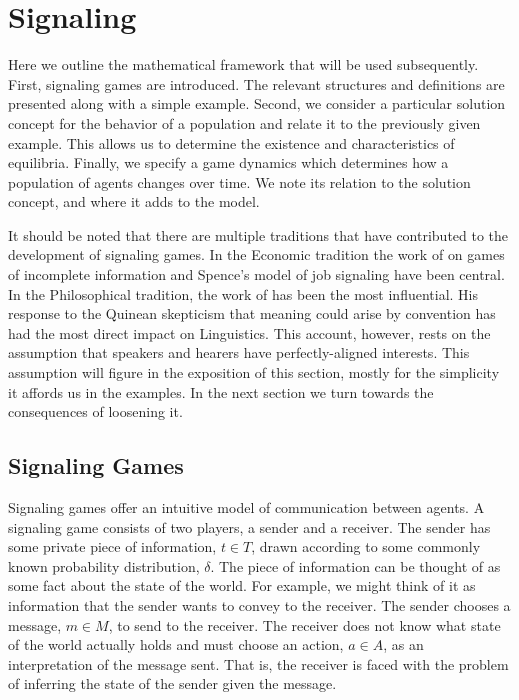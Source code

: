 \documentclass[12pt]{article}
\theoremstyle{definition} \newtheorem{definition}{Definition}
\begin{document}
\section{Signaling}
\label{Signaling}

Here we outline the mathematical framework that will be used subsequently. First, signaling games are introduced. The relevant structures and definitions are presented along with a simple example. Second, we consider a particular solution concept for the behavior of a population and relate it to the previously given example. This allows us to determine the existence and characteristics of equilibria. Finally, we specify a game dynamics which determines how a population of agents changes over time. We note its relation to the solution concept, and where it adds to the model.

It should be noted that there are multiple traditions that have contributed to the development of signaling games. In the Economic tradition the work of \cite{harsanyi:1967,harsanyi:1968a,harsanyi:1968b} on games of incomplete information and Spence's \citeyearpar{spence:1973} model of job signaling have been central. In the Philosophical tradition, the work of \cite{lewis:1969} has been the most influential. His response to the Quinean skepticism that meaning could arise by convention has had the most direct impact on Linguistics. This account, however, rests on the assumption that speakers and hearers have perfectly-aligned interests.  This assumption will figure in the exposition of this section, mostly for the simplicity it affords us in the examples. In the next section we turn towards the consequences of loosening it.


\subsection{Signaling Games}

Signaling games offer an intuitive model of communication between agents.  A signaling game consists of two players, a sender and a receiver. The sender has some private piece of information, $t \in T$, drawn according to some commonly known probability distribution, $\delta$. The piece  of information can be thought of as some fact about the state of the world. For example, we might think of it as information that the sender wants to convey to the receiver. The sender chooses a message, $m \in M$, to send to the receiver.   The receiver does not know what state of the world actually holds and must choose an action, $a \in A$, as an interpretation of the message sent. That is, the receiver is faced with the problem of inferring the state of the sender given the message.
\end{document}
